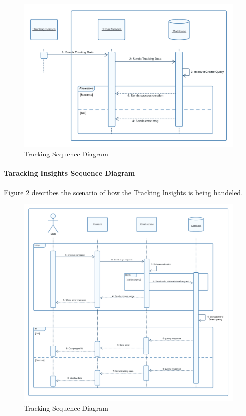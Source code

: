 \begin{figure}[ht]
	\centering
	\includegraphics[width=0.8\linewidth]{Images/Sprint3/sequence diag sprint 3/tracking insights sequence diag.png}
	\caption{ Tracking Sequence Diagram}
	\label{fig:Sprint 3 Saving Taracking Data Sequence Diagram}
\end{figure}

\clearpage
\paragraph{ Taracking Insights Sequence Diagram}

Figure \ref{fig:Sprint 3 Taracking Insights Sequence Diagram} describes the scenario of how the Tracking Insights is being handeled.

\begin{figure}[ht]
	\centering
	\includegraphics[width=\linewidth]{Images/Sprint3/sequence diag sprint 3/view insights.png}
	\caption{ Tracking Sequence Diagram}
	\label{fig:Sprint 3 Taracking Insights Sequence Diagram}
\end{figure}

\clearpage